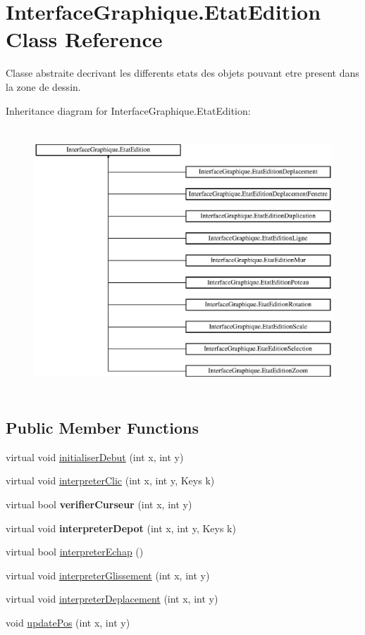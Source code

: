 \hypertarget{class_interface_graphique_1_1_etat_edition}{}\section{Interface\+Graphique.\+Etat\+Edition Class Reference}
\label{class_interface_graphique_1_1_etat_edition}


Classe abstraite decrivant les differents etats des objets pouvant etre present dans la zone de dessin.  


Inheritance diagram for Interface\+Graphique.\+Etat\+Edition\+:\begin{figure}[H]
\begin{center}
\leavevmode
\includegraphics[height=10.000000cm]{class_interface_graphique_1_1_etat_edition}
\end{center}
\end{figure}
\subsection*{Public Member Functions}
\begin{DoxyCompactItemize}
\item 
virtual void \hyperlink{group__inf2990_ga1e28e8b6a0c43384138f39e937061013}{initialiser\+Debut} (int x, int y)
\item 
virtual void \hyperlink{group__inf2990_gae1cbaf5203e0844d9d565b5b63c7eea0}{interpreter\+Clic} (int x, int y, Keys k)
\item 
virtual bool {\bfseries verifier\+Curseur} (int x, int y)
\item 
virtual void {\bfseries interpreter\+Depot} (int x, int y, Keys k)
\item 
virtual bool \hyperlink{group__inf2990_gaf4315e7507c9a54e90d76279169b7c5c}{interpreter\+Echap} ()
\item 
virtual void \hyperlink{group__inf2990_gab480f0834ca49119adc0c3fd92723348}{interpreter\+Glissement} (int x, int y)
\item 
virtual void \hyperlink{group__inf2990_gaf10b0c6cd858373e7ecc8a8a66a50320}{interpreter\+Deplacement} (int x, int y)
\item 
void \hyperlink{group__inf2990_gabcc47ac07b57fc7f58737ba9b88bcfa2}{update\+Pos} (int x, int y)
\end{DoxyCompactItemize}
